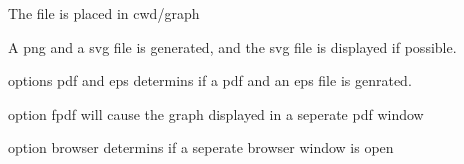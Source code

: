 \documentclass[letterpaper,10pt,english]{sphinxmanual}
\begin{document}
\begin{fulllineitems}
\begin{fulllineitems}
\sphinxAtStartPar
The file is placed in cwd/graph

\sphinxAtStartPar
A png and a svg file is generated, and the svg file is displayed if possible.

\sphinxAtStartPar
options pdf and eps determins if a pdf and an eps file is genrated.

\sphinxAtStartPar
option fpdf will cause the graph displayed in a seperate pdf window

\sphinxAtStartPar
option browser determins if a seperate browser window is open

\end{fulllineitems}


\end{fulllineitems}

\end{document}
